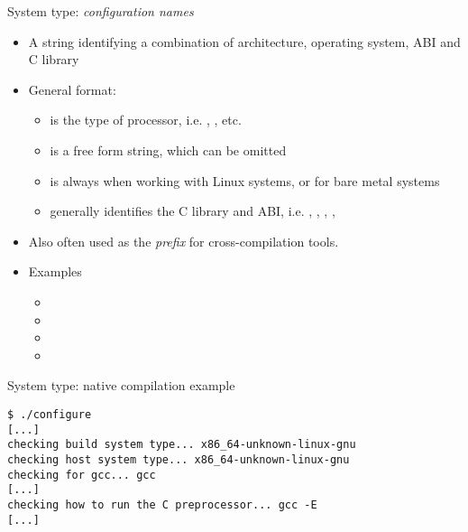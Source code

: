 \begin{frame}{System type: {\em configuration names}}
  \begin{itemize}
  \item A string identifying a combination of architecture, operating
    system, ABI and C library
  \item General format: 
    \begin{itemize}
    \item {} is the type of processor, i.e. ,
      , etc.
    \item {} is a free form string, which can be omitted
    \item {} is always  when working with
      Linux systems, or  for bare metal systems
    \item {} generally identifies the C library
      and ABI, i.e. , , ,
      , 
    \end{itemize}
  \item Also often used as the {\em prefix} for cross-compilation
    tools.
  \item Examples
    \begin{itemize}
    \item {}
    \item {}
    \item {}
    \item {}
    \end{itemize}
  \end{itemize}
\end{frame}

\begin{frame}[fragile]{System type: native compilation example}

\begin{block}{}
{\small
\begin{verbatim}
$ ./configure
[...]
checking build system type... x86_64-unknown-linux-gnu
checking host system type... x86_64-unknown-linux-gnu
checking for gcc... gcc
[...]
checking how to run the C preprocessor... gcc -E
[...]
\end{verbatim}}
\end{block}

\end{frame}

